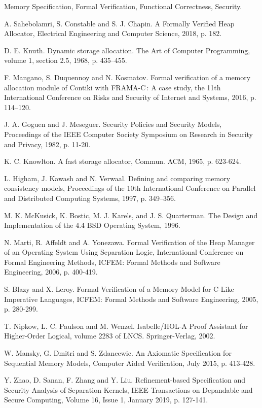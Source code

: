 \documentclass[10pt,conference,compsoc]{IEEEtran}
\begin{document}
\begin{IEEEkeywords}
Memory Specification, Formal Verification, Functional Correctness, Security.
\end{IEEEkeywords}







\begin{thebibliography}{00}
	A. Sahebolamri, S. Constable and S. J. Chapin. A Formally Verified Heap Allocator, Electrical Engineering and Computer Science, 2018, p. 182.
	
	D. E. Knuth. Dynamic storage allocation. The Art of Computer Programming, volume 1, section 2.5, 1968, p. 435–455.
	
	F. Mangano, S. Duquennoy and N. Kosmatov. Formal verification of a memory allocation module of Contiki with FRAMA-C : A case study, the 11th International Conference on Risks and Security of Internet and Systems, 2016, p. 114–120.
	
	J. A. Goguen and J. Meseguer. Security Policies and Security Models, Proceedings of the IEEE Computer Society Symposium on Research in Security and Privacy, 1982, p. 11-20.
	
	K. C. Knowlton. A fast storage allocator, Commun. ACM, 1965, p. 623-624.
	
	L. Higham, J. Kawash and N. Verwaal. Defining and comparing memory consistency models, Proceedings of the 10th International Conference on Parallel and Distributed Computing Systems, 1997, p. 349–356.
	
	M. K. McKusick, K. Bostic, M. J. Karels, and J. S. Quarterman. The Design and Implementation of the 4.4 BSD Operating System, 1996.
	
	N. Marti, R. Affeldt and A. Yonezawa. Formal Verification of the Heap Manager of an Operating System Using Separation Logic, International Conference on Formal Engineering Methods, ICFEM: Formal Methods and Software Engineering, 2006, p. 400-419.
	
	S. Blazy and X. Leroy. Formal Verification of a Memory Model for C-Like Imperative Languages, ICFEM: Formal Methods and Software Engineering, 2005, p. 280-299.
	
	T. Nipkow, L. C. Paulson and M. Wenzel. Isabelle/HOL-A Proof Assistant for Higher-Order Logical, volume 2283 of LNCS. Springer-Verlag, 2002.
	
	W. Mansky, G. Dmitri and S. Zdancewic. An Axiomatic Specification for Sequential Memory Models, Computer Aided Verification, July 2015, p. 413-428.
	
	Y. Zhao, D. Sanan, F. Zhang and Y. Liu. Refinement-based Specification and Security Analysis of Separation Kernels, IEEE Transactions on Depandable and Secure Computing, Volume 16, Issue 1, January 2019, p. 127-141.
\end{thebibliography}
\end{document}
